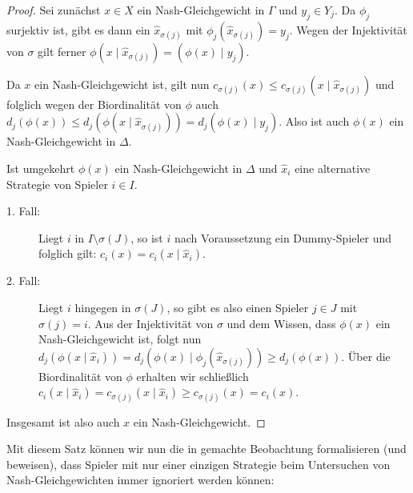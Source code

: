 \begin{proof}
	Sei zunächst $x \in X$ ein Nash-Gleichgewicht in $\Gamma$ und $y_j \in Y_j$. Da $\phi_j$ surjektiv ist, gibt es dann ein $\hat{x}_{\sigma(j)}$ mit $\phi_j(\hat{x}_{\sigma(j)}) = y_j$. Wegen der Injektivität von $\sigma$ gilt ferner $\phi(x \mid \hat{x}_{\sigma(j)}) = \left(\phi(x) \mid y_j\right)$.
	
	Da $x$ ein Nash-Gleichgewicht ist, gilt nun $c_{\sigma(j)}(x) \leq c_{\sigma(j)}(x \mid \hat{x}_{\sigma(j)})$ und folglich wegen der Biordinalität von $\phi$ auch $d_j(\phi(x)) \leq d_j(\phi(x \mid \hat{x}_{\sigma(j)})) = d_j(\phi(x) \mid y_j)$. Also ist auch $\phi(x)$ ein Nash-Gleichgewicht in $\Delta$.
	
	Ist umgekehrt $\phi(x)$ ein Nash-Gleichgewicht in $\Delta$ und $\hat{x}_i$ eine alternative Strategie von Spieler $i \in I$. 
	\begin{description}
		\item[1. Fall:] Liegt $i$ in $I\setminus \sigma(J)$, so ist $i$ nach Voraussetzung ein Dummy-Spieler und folglich gilt: $c_i(x) = c_i(x \mid \hat{x}_i)$.
		\item[2. Fall:] Liegt $i$ hingegen in $\sigma(J)$, so gibt es also einen Spieler $j \in J$ mit $\sigma(j) = i$. Aus der Injektivität von $\sigma$ und dem Wissen, dass $\phi(x)$ ein Nash-Gleichgewicht ist, folgt nun $d_j(\phi(x \mid \hat{x}_i)) = d_j(\phi(x) \mid \phi_j(\hat{x}_{\sigma(j)})) \geq d_j(\phi(x))$. Über die Biordinalität von $\phi$ erhalten wir schließlich $c_i(x \mid \hat{x}_i) = c_{\sigma(j)}(x \mid \hat{x}_i) \geq c_{\sigma(j)}(x) = c_i(x)$. 
	\end{description}
	Insgesamt ist also auch $x$ ein Nash-Gleichgewicht.
\end{proof}

Mit diesem Satz können wir nun die in  gemachte Beobachtung formalisieren (und beweisen), dass Spieler mit nur einer einzigen Strategie beim Untersuchen von Nash-Gleichgewichten immer ignoriert werden können:


